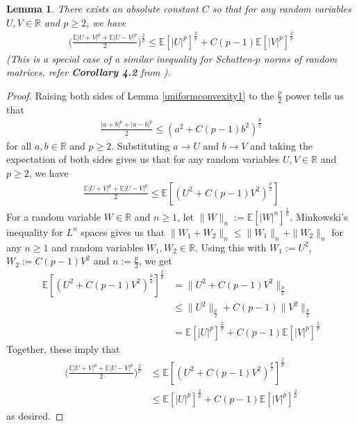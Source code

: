 \documentclass[11pt, reqno,english]{amsart}
\newtheorem{lemma}{Lemma}[section]
\begin{document}
\begin{lemma}\label{uniformconvexity2}
There exists an absolute constant $C$ so that for any random variables $U,V \in \mathbb{R}$ and $p \geq 2$, we have
\begin{align*}
\bigg(\frac{\mathbb{E}|U+V|^p + \mathbb{E}|U-V|^p}{2}\bigg)^{\frac{2}{p}} \leq \mathbb{E}[|U|^p]^{\frac{2}{p}} + C(p-1)\mathbb{E}[|V|^p]^{\frac{2}{p}}
\end{align*}
(This is a special case of a similar inequality for Schatten-$p$ norms of random matrices, refer \textbf{Corollary 4.2} from \cite{huang2022matrix}).
\end{lemma}
\begin{proof}
Raising both sides of Lemma \ref{uniformconvexity1} to the $\frac{p}{2}$ power tells us that
\begin{align*}
\frac{|a + b|^p + |a - b|^p}{2} \leq (a^2 + C(p-1)b^2)^{\frac{p}{2}}
\end{align*}
for all $a, b \in \mathbb{R}$ and $p \geq 2$. Substituting $a \to U$ and $b \to V$ and taking the expectation of both sides gives us that for any random variables $U, V \in \mathbb{R}$ and $p \geq 2$, we have
\begin{align*}
\frac{\mathbb{E}|U+V|^p + \mathbb{E}|U-V|^p}{2} \leq \mathbb{E}[(U^2 + C(p-1)V^2)^{\frac{p}{2}}]
\end{align*}
For a random variable $W \in \mathbb{R}$ and $n \geq 1$, let $\|W\|_n := \mathbb{E}[|W|^n]^{\frac{1}{n}}$. Minkowski's inequality for $L^n$ spaces gives us that $\|W_1 + W_2\|_n \leq \|W_1\|_n + \|W_2\|_n$ for any $n \geq 1$ and random variables $W_1, W_2 \in \mathbb{R}$. Using this with $W_1 := U^2$, $W_2 := C(p-1)V^2$ and $n := \frac{p}{2}$, we get
\begin{align*}
\mathbb{E}[(U^2 + C(p-1)V^2)^{\frac{p}{2}}]^{\frac{2}{p}} &= \|U^2 + C(p-1)V^2\|_{\frac{p}{2}}
\\
&\leq \|U^2\|_{\frac{p}{2}} + C(p-1)\|V^2\|_{\frac{p}{2}}
\\
&= \mathbb{E}[|U|^p]^{\frac{2}{p}} + C(p-1)\mathbb{E}[|V|^p]^{\frac{2}{p}}
\end{align*}
Together, these imply that
\begin{align*}
\bigg(\frac{\mathbb{E}|U + V|^p + \mathbb{E}|U-V|^p}{2}\bigg)^{\frac{2}{p}} &\leq \mathbb{E}[(U^2 + C(p-1)V^2)^{\frac{p}{2}}]^{\frac{2}{p}} 
\\
&\leq \mathbb{E}[|U|^p]^{\frac{2}{p}} + C(p-1)\mathbb{E}[|V|^p]^{\frac{2}{p}}
\end{align*}
as desired.
\end{proof}
\end{document}
